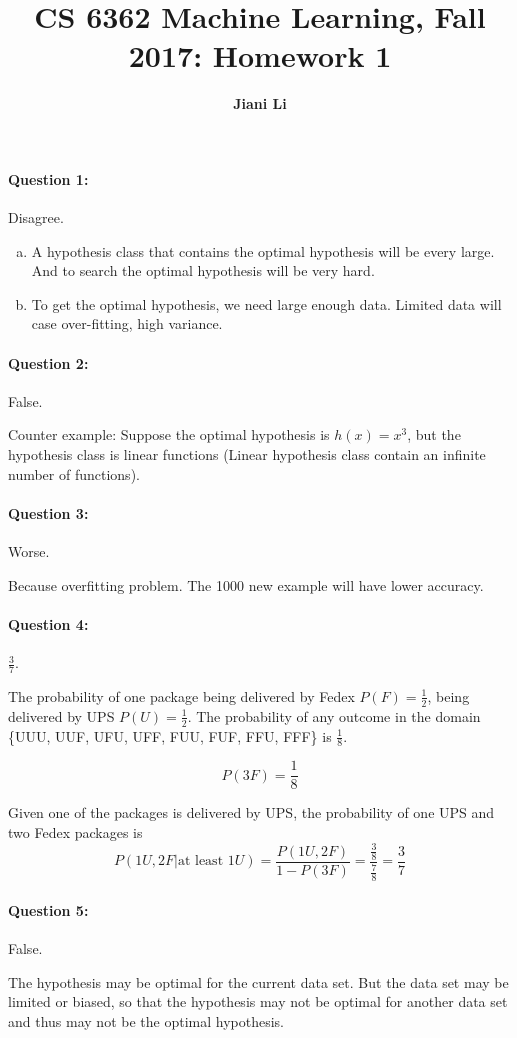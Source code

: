 \documentclass[letterpaper,11pt]{article}
\title{CS 6362 Machine Learning, Fall 2017: Homework 1}
\date{}
\author{\bf Jiani Li}
\begin{document}
\maketitle

\paragraph{Question 1:}
Disagree. 
\begin{enumerate}[(a)]
\item A hypothesis class that contains the optimal hypothesis will be every large. And to search the optimal hypothesis will be very hard. 
\item To get the optimal hypothesis, we need large enough data. Limited data will case over-fitting, high variance.
\end{enumerate}

\paragraph{Question 2:}
False.

Counter example: Suppose the optimal hypothesis is $h(x) = x^3$, but the hypothesis class is linear functions (Linear hypothesis class contain an infinite number of functions). 

\paragraph{Question 3:}
Worse.

Because overfitting problem. The 1000 new example will have lower accuracy.

\paragraph{Question 4:}
$\frac{3}{7}$.

The probability of one package being delivered by Fedex $P(F) = \frac{1}{2}$, being delivered by UPS $P(U) = \frac{1}{2}$.
The probability of any outcome in the domain \{UUU, UUF, UFU, UFF, FUU, FUF, FFU, FFF\} is $\frac{1}{8}$.

\begin{equation}
P(3F) = \frac{1}{8}
\end{equation}

Given one of the packages is delivered by UPS, the probability of one UPS and two Fedex packages is
\begin{equation}
P(1U, 2F | \text{at least } 1U) = \frac{P(1U, 2F)}{1 - P(3F)} = \frac{\frac{3}{8} }{ \frac{7}{8} }= \frac{3}{7}
\end{equation}

\paragraph{Question 5:}
False.

The hypothesis may be optimal for the current data set. But the data set may be limited or biased, so that the hypothesis may not be optimal for another data set and thus may not be the optimal hypothesis.
\end{document}

